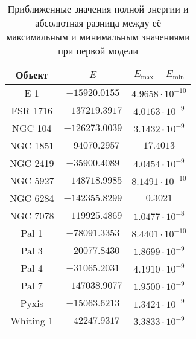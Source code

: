 \documentclass[a4paper, oneside]{article}
\begin{document}
\begin{table}[h]
  \centering
  \caption{Приближенные значения полной энергии и абсолютная разница между её максимальным и минимальным значениями при первой модели}
  \begin{tabular}{ccc}
    \toprule
    Объект &
    $ E $ &
    $ E_\text{max} - E_\text{min} $ \\
    \midrule
    \arrayrulecolor{black!40}
    E 1 & $ -15920.0155 $ & $ 4.9658 \cdot 10^{-10} $ \\
    \midrule
    FSR 1716 & $ -137219.3917 $ & $ 4.0163 \cdot 10^{-9} $ \\
    \midrule
    NGC 104 & $ -126273.0039 $ & $ 3.1432 \cdot 10^{-9} $ \\
    \midrule
    NGC 1851 & $ -94070.2957 $ & $ 17.4013 $ \\
    \midrule
    NGC 2419 & $ -35900.4089 $ & $ 4.0454 \cdot 10^{-9} $ \\
    \midrule
    NGC 5927 & $ -148718.9985 $ & $ 8.1491 \cdot 10^{-10} $ \\
    \midrule
    NGC 6284 & $ -142355.8299 $ & $ 0.3021 $ \\
    \midrule
    NGC 7078 & $ -119925.4869 $ & $ 1.0477 \cdot 10^{-8} $ \\
    \midrule
    Pal 1 & $ -78091.3353 $ & $ 8.4401 \cdot 10^{-10} $ \\
    \midrule
    Pal 3 & $ -20077.8430 $ & $ 1.8699 \cdot 10^{-9} $ \\
    \midrule
    Pal 4 & $ -31065.2031 $ & $ 4.1910 \cdot 10^{-9} $ \\
    \midrule
    Pal 7 & $ -147038.9077 $ & $ 1.9500 \cdot 10^{-9} $ \\
    \midrule
    Pyxis & $ -15063.6213 $ & $ 1.3424 \cdot 10^{-9} $ \\
    \midrule
    Whiting 1 & $ -42247.9317 $ & $ 3.3833 \cdot 10^{-9} $ \\
    \arrayrulecolor{black}
    \bottomrule
  \end{tabular}
\end{table}

\newpage
\end{document}

